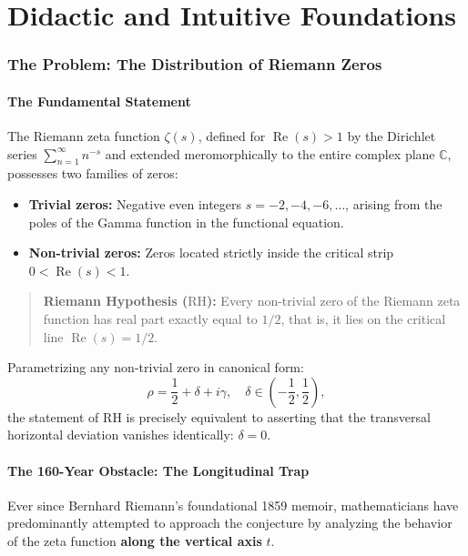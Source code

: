 \documentclass[11pt,a4paper]{article}
\theoremstyle{definition}
\theoremstyle{remark}
\begin{document}
\newpage

\part{Didactic and Intuitive Foundations}

\section{The Problem: The Distribution of Riemann Zeros}

\subsection{The Fundamental Statement}
The Riemann zeta function $\zeta(s)$, defined for $\operatorname{Re}(s) > 1$ by the Dirichlet series $\sum_{n=1}^\infty n^{-s}$ and extended meromorphically to the entire complex plane $\mathbb{C}$, possesses two families of zeros:
\begin{itemize}
    \item \textbf{Trivial zeros:} Negative even integers $s = -2, -4, -6, \dots$, arising from the poles of the Gamma function in the functional equation.
    \item \textbf{Non-trivial zeros:} Zeros located strictly inside the critical strip $0 < \operatorname{Re}(s) < 1$.
\end{itemize}

\begin{quote}
\textbf{Riemann Hypothesis ($\mathrm{RH}$):} Every non-trivial zero of the Riemann zeta function has real part exactly equal to $1/2$, that is, it lies on the critical line $\operatorname{Re}(s) = 1/2$.
\end{quote}

Parametrizing any non-trivial zero in canonical form:
\begin{equation}
\rho = \frac{1}{2} + \delta + i\gamma, \quad \delta \in \left(-\frac{1}{2}, \frac{1}{2}\right),
\end{equation}
the statement of $\mathrm{RH}$ is precisely equivalent to asserting that the transversal horizontal deviation vanishes identically: $\delta = 0$.

\subsection{The 160-Year Obstacle: The Longitudinal Trap}
Ever since Bernhard Riemann's foundational 1859 memoir, mathematicians have predominantly attempted to approach the conjecture by analyzing the behavior of the zeta function \textbf{along the vertical axis} $t$.
\end{document}
